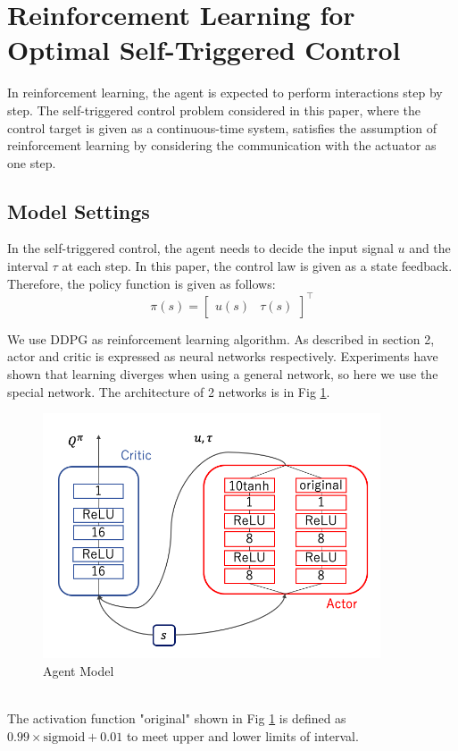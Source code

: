 \documentclass[english, dvipdfmx]{ampmt}             %
\begin{document}
\section{Reinforcement Learning for Optimal Self-Triggered Control}
In reinforcement learning, the agent is expected to perform interactions step by step. The self-triggered control problem considered in this paper, where the control target is given as a continuous-time system, satisfies the assumption of reinforcement learning by considering the communication with the actuator as one step.\par

\subsection{Model Settings}
In the self-triggered control, the agent needs to decide  the input signal $u$ and the interval $\tau$ at each step. In this paper, the control law is given as a state feedback. Therefore, the policy function is given as follows:
\begin{equation}
	\pi(s) = \begin{bmatrix}u(s) & \tau(s)\end{bmatrix}^{\top}
\end{equation}\par
We use DDPG as reinforcement learning algorithm. As described in section 2, actor and critic is expressed as neural networks respectively. Experiments have shown that learning diverges when using a general network, so here we use the special network. The architecture of 2 networks is in Fig \ref{NN}.
\begin{figure}[h]
	\centering
 	\includegraphics[width=10cm]{model.png}
 	\caption{Agent Model} \label{NN}
\end{figure}\\
The activation function "original" shown in Fig \ref{NN} is defined as $0.99 \times \textrm{sigmoid} + 0.01$ to meet upper and lower limits of interval.
\end{document}
